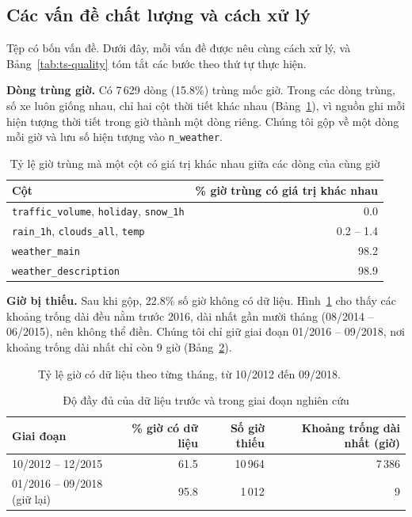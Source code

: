 \subsection{Các vấn đề chất lượng và cách xử lý}
\label{sec:ts-quality}
\label{sec:ts-clean}
Tệp có bốn vấn đề. Dưới đây, mỗi vấn đề được nêu cùng cách xử lý, và Bảng~\ref{tab:ts-quality} tóm tắt các bước theo thứ tự thực hiện.

\textbf{Dòng trùng giờ.} Có 7\,629 dòng (15.8\%) trùng mốc giờ. Trong các dòng trùng, số xe luôn giống nhau, chỉ hai cột thời tiết khác
nhau (Bảng~\ref{tab:ts-dup}), vì nguồn ghi mỗi hiện tượng thời tiết trong giờ thành một dòng riêng. Chúng tôi gộp về một dòng mỗi giờ và
lưu số hiện tượng vào \texttt{n\_weather}.

\begin{table}[H]
\centering
\caption{Tỷ lệ giờ trùng mà một cột có giá trị khác nhau giữa các dòng của cùng giờ}
\label{tab:ts-dup}
\small
\begin{tabular}{lr}
\toprule
Cột & \% giờ trùng có giá trị khác nhau\\
\midrule
\texttt{traffic\_volume}, \texttt{holiday}, \texttt{snow\_1h} & 0.0\\
\texttt{rain\_1h}, \texttt{clouds\_all}, \texttt{temp} & 0.2 -- 1.4\\
\texttt{weather\_main} & 98.2\\
\texttt{weather\_description} & 98.9\\
\bottomrule
\end{tabular}
\end{table}

\textbf{Giờ bị thiếu.} Sau khi gộp, 22.8\% số giờ không có dữ liệu. Hình~\ref{fig:ts-coverage} cho thấy các khoảng trống dài đều nằm trước
2016, dài nhất gần mười tháng (08/2014 -- 06/2015), nên không thể điền. Chúng tôi chỉ giữ giai đoạn 01/2016 -- 09/2018, nơi khoảng trống
dài nhất chỉ còn 9 giờ (Bảng~\ref{tab:ts-window}).

\begin{figure}[H]
\centering
{}
\caption{Tỷ lệ giờ có dữ liệu theo từng tháng, từ 10/2012 đến 09/2018.}
\label{fig:ts-coverage}
\end{figure}

\begin{table}[H]
\centering
\caption{Độ đầy đủ của dữ liệu trước và trong giai đoạn nghiên cứu}
\label{tab:ts-window}
\small
\begin{tabular}{lrrr}
\toprule
Giai đoạn & \% giờ có dữ liệu & Số giờ thiếu & Khoảng trống dài nhất (giờ)\\
\midrule
10/2012 -- 12/2015 & 61.5 & 10\,964 & 7\,386\\
01/2016 -- 09/2018 (giữ lại) & 95.8 & 1\,012 & 9\\
\bottomrule
\end{tabular}
\end{table}

